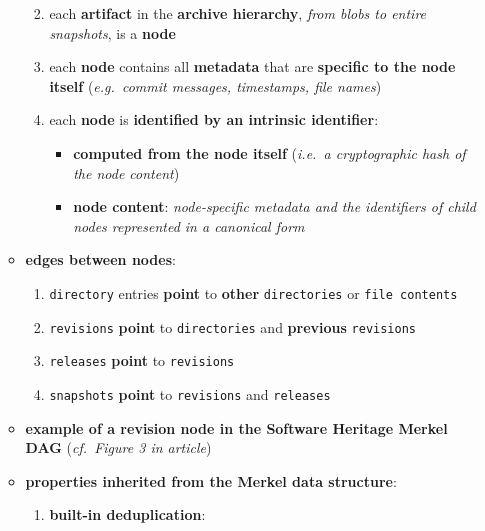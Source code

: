 \documentclass[11pt]{article}
\providecommand{\tightlist}{%
      \setlength{\itemsep}{0pt}\setlength{\parskip}{0pt}}
\begin{document}
\begin{enumerate}
\begin{itemize}
    \begin{enumerate}
    \def\labelenumii{\arabic{enumii}.}
    \tightlist
    \item
      each \textbf{artifact} in the \textbf{archive hierarchy},
      \emph{from blobs to entire snapshots}, is a \textbf{node}
    \item
      each \textbf{node} contains all \textbf{metadata} that are
      \textbf{specific to the node itself} (\emph{e.g.~commit messages,
      timestamps, file names})
    \item
      each \textbf{node} is \textbf{identified by an intrinsic
      identifier}:

      \begin{itemize}
      \tightlist
      \item
        \textbf{computed from the node itself} (\emph{i.e.~a
        cryptographic hash of the node content})
      \item
        \textbf{node content}: \emph{node-specific metadata and the
        identifiers of child nodes represented in a canonical form}
      \end{itemize}
    \end{enumerate}
  \item
    \textbf{edges between nodes}:

    \begin{enumerate}
    \def\labelenumii{\arabic{enumii}.}
    \tightlist
    \item
      \texttt{directory} entries \textbf{point} to \textbf{other}
      \texttt{directories} or \texttt{file\ contents}
    \item
      \texttt{revisions} \textbf{point} to \texttt{directories} and
      \textbf{previous} \texttt{revisions}
    \item
      \texttt{releases} \textbf{point} to \texttt{revisions}
    \item
      \texttt{snapshots} \textbf{point} to \texttt{revisions} and
      \texttt{releases}
    \end{enumerate}
  \item
    \textbf{example of a revision node in the Software Heritage Merkel
    DAG} (\emph{cf.~Figure 3 in article})
  \item
    \textbf{properties inherited from the Merkel data structure}:

    \begin{enumerate}
    \def\labelenumii{\arabic{enumii}.}
    \tightlist
    \item
      \textbf{built-in deduplication}:


\end{enumerate}
\end{itemize}
\end{enumerate}
\end{document}
